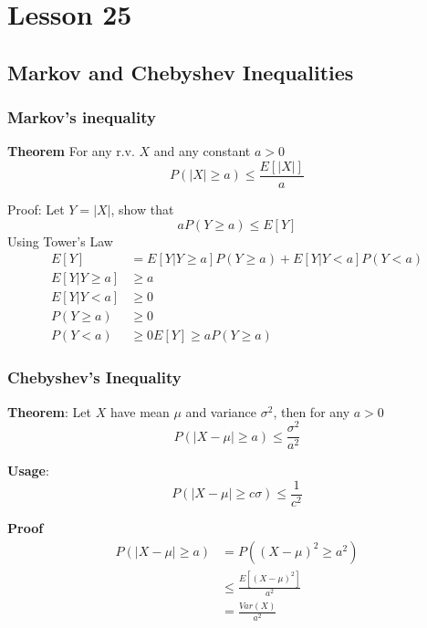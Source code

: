 \chapter{Lesson 25}

\section{Markov and Chebyshev Inequalities}

\subsection{Markov's inequality}
\begin{framed}
   \textbf{Theorem} For any r.v. $X$ and any constant $a > 0$
    \[
     P \left( |X| \geq a \right)  \leq \frac{E\left[ |X|\right] }{a}
   \] 

   Proof: Let $Y = |X|$, show that 
   \[
      a P(Y \geq a) \leq E[Y]
   \] 
   Using Tower's Law
   \begin{align*}
      E[Y] &= E\left[ Y | Y \geq a\right]  P(Y \geq a) + E\left[ Y | Y < a\right]  P(Y < a) \\
      E\left[ Y | Y \geq a\right]  &\geq a \\
      E\left[ Y | Y < a\right]  &\geq 0 \\
      P(Y \geq a)  &\geq 0 \\
      P(Y < a)  &\geq 0
      E[Y] \geq aP(Y \geq a) 
   \end{align*}
\end{framed}

\subsection{Chebyshev's Inequality}
\begin{framed}
   \textbf{Theorem}: Let $X$ have mean $\mu$ and variance $\sigma^2$, then for any $a > 0$
    \[
     P( |X - \mu| \geq a) \leq \frac{\sigma^2}{ a^2}
   \] 

   \textbf{Usage}: 
   \[
     P ( |X - \mu| \geq c \sigma) \leq \frac{1}{c^2}
   \] 

   \textbf{Proof}
   \begin{align*}
      P( |X - \mu| \geq a) &= P( (X - \mu)^2 \geq a^2) \\
                           &\leq \frac{E\left[ (X - \mu)^2\right] }{a^2} \\
                           &= \frac{Var(X)}{ a^2}
   \end{align*}
\end{framed}

